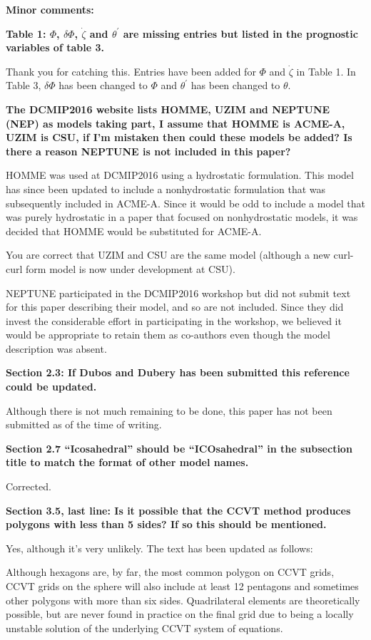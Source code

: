 \documentclass{article}
\begin{document}
\textbf{{Minor comments:}}

\textbf{{Table 1: $\Phi$, $\delta \Phi$, $\dot{\zeta}$ and $\theta^\prime$ are missing entries but listed in the prognostic variables of table 3.}}

Thank you for catching this.  Entries have been added for $\Phi$ and $\dot{\zeta}$ in Table 1.  In Table 3, $\delta \Phi$ has been changed to $\Phi$ and $\theta^\prime$ has been changed to $\theta$.

\textbf{{The DCMIP2016 website lists HOMME, UZIM and NEPTUNE (NEP) as models
taking part, I assume that HOMME is ACME-A, UZIM is CSU, if I'm mistaken then
could these models be added? Is there a reason NEPTUNE is not included in
this paper?}}

HOMME was used at DCMIP2016 using a hydrostatic formulation.  This model has since been updated to include a nonhydrostatic formulation that was subsequently included in ACME-A.  Since it would be odd to include a model that was purely hydrostatic in a paper that focused on nonhydrostatic models, it was decided that HOMME would be substituted for ACME-A.

You are correct that UZIM and CSU are the same model (although a new curl-curl form model is now under development at CSU).

NEPTUNE participated in the DCMIP2016 workshop but did not submit text for this paper describing their model, and so are not included.  Since they did invest the considerable effort in participating in the workshop, we believed it would be appropriate to retain them as co-authors even though the model description was absent.

\textbf{{Section 2.3: If Dubos and Dubery has been submitted this reference could be
updated.}}

Although there is not much remaining to be done, this paper has not been submitted as of the time of writing.

\textbf{{Section 2.7 ``Icosahedral'' should be ``ICOsahedral'' in the subsection title to match
the format of other model names.}}

Corrected.

\textbf{{Section 3.5, last line: Is it possible that the CCVT method produces polygons
with less than 5 sides? If so this should be mentioned.}}

Yes, although it's very unlikely.  The text has been updated as follows:

{\color{blue}Although hexagons are, by far, the most common polygon on CCVT grids, CCVT grids on the sphere will also include at least 12 pentagons and sometimes other polygons with more than six sides.  Quadrilateral elements are theoretically possible, but are never found in practice on the final grid due to being a locally unstable solution of the underlying CCVT system of equations.}
\end{document}
